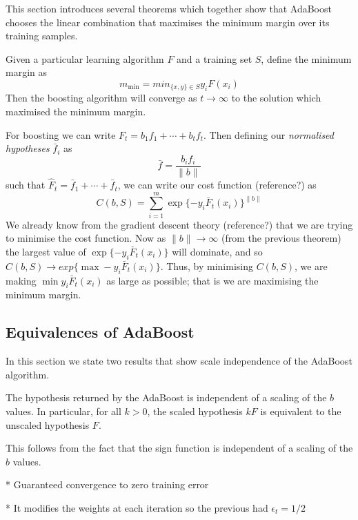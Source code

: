 This section introduces several theorems which together show that
AdaBoost chooses the linear combination that maximises the minimum
margin over its training samples.

\begin{theorem}
Given a particular learning algorithm $F$ and a training
set $S$, define the minimum margin as
\[
m_{\min} = min_{\{x,y\} \in S} y_i F(x_i)
\]
Then the boosting algorithm will converge as $t \rightarrow \infty$ to
the solution which maximised the minimum margin.

\proof For boosting we can write $F_t = b_1 f_1 + \cdots + b_t f_t$.
Then defining our \emph{normalised hypotheses} $\bar{f}_i$ as
\[
\bar{f} = \frac{b_i f_i}{\|b\|}
\]
such that $\hat{F}_t = \bar{f}_1 + \cdots + \bar{f}_t$, we can write
our cost function (reference?) as 
\[
C(b, S) = \sum_{i=1}^{m} \exp\{-y_i \bar{F}_t(x_i)\}^{\|b\|}
\]
We already know from the gradient descent theory (reference?) that we
are trying to minimise the cost function.  Now as $\|b\| \rightarrow
\infty$ (from the previous theorem) the largest value of $\exp\{-y_i
\bar{F}_t(x_i)\}$ will dominate, and so $C(b, S) \rightarrow exp\{\max
-y_i \bar{F}_t(x_i)\}$.  Thus, by minimising $C(b, S)$, we are making
$\min y_i \bar{F}_t(x_i)$ as large as possible; that is we are
maximising the minimum margin.
\end{theorem}


\subsection{Equivalences of AdaBoost}

In this section we state two results that show scale independence of
the AdaBoost algorithm.

\begin{theorem}
The hypothesis returned by the AdaBoost is independent of a 
scaling of the $b$ values.  In particular, for all $k > 0$, the
scaled hypothesis $kF$ is equivalent to the unscaled hypothesis $F$.

\proof This follows from the fact that the sign function is
independent of a scaling of the $b$ values.
\end{theorem}




* Guaranteed convergence to zero training error

  * It modifies the weights at each iteration so the previous had
    $\epsilon_t = 1/2$

